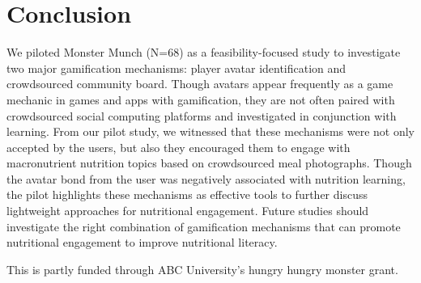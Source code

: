 \section{Conclusion}
We piloted Monster Munch (N=68) as a feasibility-focused study to investigate two major gamification mechanisms: player avatar identification and crowdsourced community board. Though avatars appear frequently as a game mechanic in games and apps with gamification, they are not often paired with crowdsourced social computing platforms and investigated in conjunction with learning. From our pilot study, we witnessed that these mechanisms were not only accepted by the users, but also they encouraged them to engage with macronutrient nutrition topics based on crowdsourced meal photographs. Though the avatar bond from the user was negatively associated with nutrition learning, the pilot highlights these mechanisms as effective tools to further discuss lightweight approaches for nutritional engagement. Future studies should investigate the right combination of gamification mechanisms that can promote nutritional engagement to improve nutritional literacy.


\begin{acks}
This is partly funded through ABC University's hungry hungry monster grant.
\end{acks}
